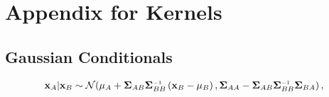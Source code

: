 
\inbpdocument

\chapter{Appendix for Kernels}


\section{Gaussian Conditionals}
%
\begin{align}
\vx_A | \vx_B \sim \Nt{\vmu_A + \vSigma_{AB} \vSigma_{BB}\inv \left( \vx_B - \vmu_B \right) }
{\vSigma_{AA} - \vSigma_{AB} \vSigma_{BB}\inv \vSigma_{BA} },
\label{eq:gauss_conditional}
\end{align}
%

\outbpdocument{


}
